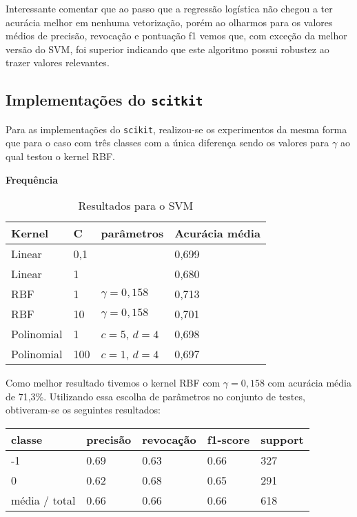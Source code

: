 Interessante comentar que ao passo que a regressão logística não chegou a ter
acurácia melhor em nenhuma vetorização, porém ao olharmos para os valores médios de precisão,
revocação e pontuação f1 vemos que, com exceção da melhor versão do SVM, foi superior indicando
que este algoritmo possui robustez ao trazer valores relevantes.

\subsection{Implementações do \texttt{scitkit}}

Para as implementações do \texttt{scikit}, realizou-se os experimentos da mesma forma que
para o caso com três classes com a única diferença sendo os valores para $\gamma$ ao qual
testou o kernel RBF.

\textbf{Frequência}

\begin{table}[H]
	\centering
	\caption{Resultados para o SVM}
	\begin{tabular}{l l l l}
		\hline
		Kernel & C & parâmetros & Acurácia média \\
		\hline
		Linear & 0,1 & & 0,699 \\
		\hline
		Linear & 1 & & 0,680 \\
		\hline
		RBF & 1 & $\gamma = 0,158$ & 0,713 \\
		\hline
		RBF & 10 & $\gamma = 0,158$ & 0,701 \\
		\hline
		Polinomial & 1 & $c = 5$, $d = 4$ & 0,698 \\
		\hline
		Polinomial & 100 & $c = 1$, $d = 4$ & 0,697 \\
		\hline
	\end{tabular}
\end{table}

Como melhor resultado tivemos o kernel RBF com $\gamma = 0,158$ com acurácia média
de 71,3\%. Utilizando essa escolha de parâmetros no conjunto de testes, obtiveram-se
os seguintes resultados:

\begin{table}[H]
	\centering
		\begin{tabular}{l | l | l | l | l}
		\hline
		classe  	&	precisão  &  revocação &  f1-score &  support \\
		\hline
		 -1    &   0.69   &   0.63   &   0.66   &    327 \\
		 \hline
          0    &   0.62   &   0.68   &   0.65   &    291 \\
		\hline
		média / total   &    0.66   &   0.66   &   0.66   &    618 \\
		\hline
	\end{tabular}
\end{table}

